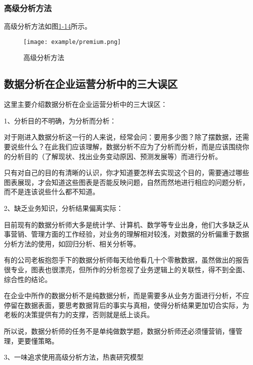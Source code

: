 \subsubsection{高级分析方法}

高级分析方法如图\href{figure:1-14}{1-14}所示。

\begin{figure}[!htp]

\centering
\texttt{[image: example/premium.png]}
\caption{高级分析方法}
\label{figure:1-13}

\end{figure}

\subsection{数据分析在企业运营分析中的三大误区}

这里主要介绍数据分析在企业运营分析中的三大误区：

1、分析目的不明确，为分析而分析：

对于刚进入数据分析这一行的人来说，经常会问：要用多少图？除了摆数据，还需要说些什么？在此我们应该理解，数据分析不应为了分析而分析，而是应该围绕你的分析目的（了解现状、找出业务变动原因、预测发展等）而进行分析。

只有对自己的目的有清晰的认识，你才知道要怎样去实现这个目的，需要通过哪些图表展现，才会知道这些图表是否能反映问题，自然而然地进行相应的问题分析，而不是连该说些什么都不知道。

2、缺乏业务知识，分析结果偏离实际：

目前现有的数据分析师大多是统计学、计算机、数学等专业出身，他们大多缺乏从事营销、管理方面的工作经验，对业务的理解相对较浅，对数据的分析偏重于数据分析方法的使用，如回归分析、相关分析等。

有的公司老板抱怨手下的数据分析师每天给他看几十个零散数据，虽然做出的报告很专业，图表也很漂亮，但所作的分析忽视了业务逻辑上的关联性，得不到全面、综合性的结论。

在企业中所作的数据分析不是纯数据分析，而是需要多从业务方面进行分析，不应停留在数据表面，要思考数据背后的事实与真相，使得分析结果更加切合实际，为老板的决策提供有力的支撑，否则就是纸上谈兵。

所以说，数据分析师的任务不是单纯做数学题，数据分析师还必须懂营销，懂管理，更要懂策略。

3、一味追求使用高级分析方法，热衷研究模型

